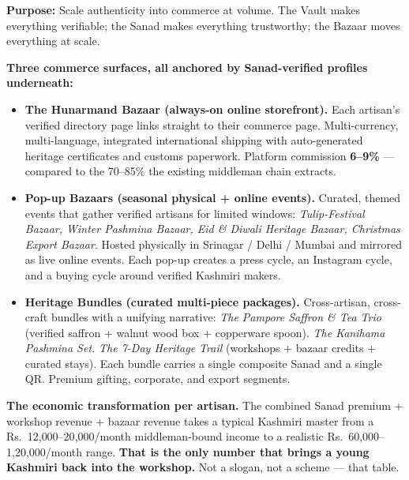 \documentclass[11pt, a4paper]{article}
\begin{document}
\begin{layerbox}

\textbf{Purpose:} Scale authenticity into commerce at volume. The Vault makes everything verifiable; the Sanad makes everything trustworthy; the Bazaar moves everything at scale.

\textbf{Three commerce surfaces, all anchored by Sanad-verified profiles underneath:}

\begin{itemize}
  \item \textbf{The Hunarmand Bazaar (always-on online storefront).} Each artisan's verified directory page links straight to their commerce page. Multi-currency, multi-language, integrated international shipping with auto-generated heritage certificates and customs paperwork. Platform commission \textbf{6--9\%} --- compared to the 70--85\% the existing middleman chain extracts.

  \item \textbf{Pop-up Bazaars (seasonal physical + online events).} Curated, themed events that gather verified artisans for limited windows: {\itshape Tulip-Festival Bazaar, Winter Pashmina Bazaar, Eid \& Diwali Heritage Bazaar, Christmas Export Bazaar}. Hosted physically in Srinagar / Delhi / Mumbai and mirrored as live online events. Each pop-up creates a press cycle, an Instagram cycle, and a buying cycle around verified Kashmiri makers.

  \item \textbf{Heritage Bundles (curated multi-piece packages).} Cross-artisan, cross-craft bundles with a unifying narrative: {\itshape The Pampore Saffron \& Tea Trio} (verified saffron + walnut wood box + copperware spoon). {\itshape The Kanihama Pashmina Set.} {\itshape The 7-Day Heritage Trail} (workshops + bazaar credits + curated stays). Each bundle carries a single composite Sanad and a single QR. Premium gifting, corporate, and export segments.
\end{itemize}

\textbf{The economic transformation per artisan.} The combined Sanad premium + workshop revenue + bazaar revenue takes a typical Kashmiri master from a Rs.\ 12{,}000--20{,}000/month middleman-bound income to a realistic Rs.\ 60{,}000--1{,}20{,}000/month range. \textbf{That is the only number that brings a young Kashmiri back into the workshop.} Not a slogan, not a scheme --- that table.


\end{layerbox}
\end{document}
